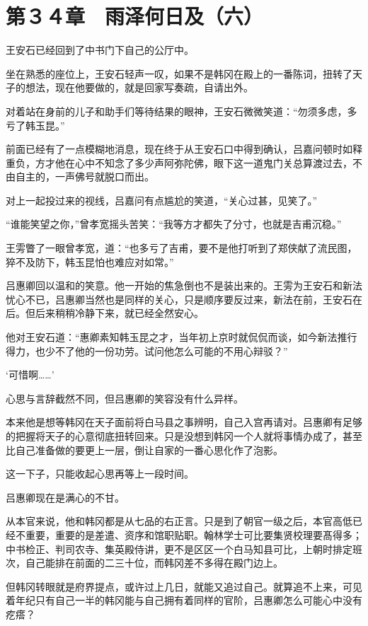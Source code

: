 \section{第３４章　雨泽何日及（六）}

王安石已经回到了中书门下自己的公厅中。

坐在熟悉的座位上，王安石轻声一叹，如果不是韩冈在殿上的一番陈词，扭转了天子的想法，现在他要做的，就是回家写奏疏，自请出外。

对着站在身前的儿子和助手们等待结果的眼神，王安石微微笑道：“勿须多虑，多亏了韩玉昆。”

前面已经有了一点模糊地消息，现在终于从王安石口中得到确认，吕嘉问顿时如释重负，方才他在心中不知念了多少声阿弥陀佛，眼下这一道鬼门关总算渡过去，不由自主的，一声佛号就脱口而出。

对上一起投过来的视线，吕嘉问有点尴尬的笑道，“关心过甚，见笑了。”

“谁能笑望之你，”曾孝宽摇头苦笑：“我等方才都失了分寸，也就是吉甫沉稳。”

王雱瞥了一眼曾孝宽，道：“也多亏了吉甫，要不是他打听到了郑侠献了流民图，猝不及防下，韩玉昆怕也难应对如常。”

吕惠卿回以温和的笑意。他一开始的焦急倒也不是装出来的。王雱为王安石和新法忧心不已，吕惠卿当然也是同样的关心，只是顺序要反过来，新法在前，王安石在后。但后来稍稍冷静下来，就已经全然安心。

他对王安石道：“惠卿素知韩玉昆之才，当年初上京时就侃侃而谈，如今新法推行得力，也少不了他的一份功劳。试问他怎么可能的不用心辩驳？”

‘可惜啊……’

心思与言辞截然不同，但吕惠卿的笑容没有什么异样。

本来他是想等韩冈在天子面前将白马县之事辨明，自己入宫再请对。吕惠卿有足够的把握将天子的心意彻底扭转回来。只是没想到韩冈一个人就将事情办成了，甚至比自己准备做的要更上一层，倒让自家的一番心思化作了泡影。

这一下子，只能收起心思再等上一段时间。

吕惠卿现在是满心的不甘。

从本官来说，他和韩冈都是从七品的右正言。只是到了朝官一级之后，本官高低已经不重要，重要的是差遣、资序和馆职贴职。翰林学士可比要集贤校理要髙得多；中书检正、判司农寺、集英殿侍讲，更不是区区一个白马知县可比，上朝时排定班次，自己能排在前面的二三十位，而韩冈差不多得在殿门边上。

但韩冈转眼就是府界提点，或许过上几日，就能又追过自己。就算追不上来，可见着年纪只有自己一半的韩冈能与自己拥有着同样的官阶，吕惠卿怎么可能心中没有疙瘩？

